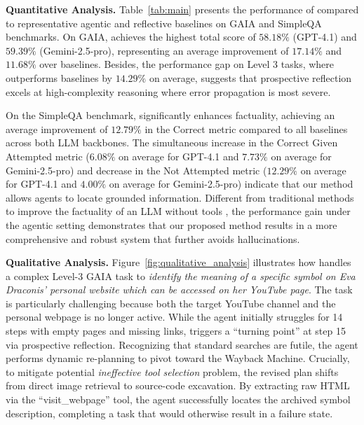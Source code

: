 \noindent\textbf{Quantitative Analysis.} Table~\ref{tab:main} presents the performance of \method compared to representative agentic and reflective baselines on GAIA and SimpleQA benchmarks. On GAIA, \method achieves the highest total score of $58.18\%$ (GPT-4.1) and $59.39\%$ (Gemini-2.5-pro), representing an average improvement of $17.14\%$ and $11.68\%$ over baselines. Besides, the performance gap on Level 3 tasks, where \method outperforms baselines by $14.29\%$ on average, suggests that prospective reflection excels at high-complexity reasoning where error propagation is most severe.

On the SimpleQA benchmark, \method significantly enhances factuality, achieving an average improvement of $12.79\%$ in the Correct metric compared to all baselines across both LLM backbones. The simultaneous increase in the Correct Given Attempted metric ($6.08\%$ on average for GPT-4.1 and $7.73\%$ on average for Gemini-2.5-pro) and decrease in the Not Attempted metric ($12.29\%$ on average for GPT-4.1 and $4.00\%$ on average for Gemini-2.5-pro) indicate that our method allows agents to locate grounded information. Different from traditional methods to improve the factuality of an LLM without tools \citep{wang2025truthflow, cao2024personalized}, the performance gain under the agentic setting demonstrates that our proposed method results in a more comprehensive and robust system that further avoids hallucinations.




\noindent\textbf{Qualitative Analysis.} Figure~\ref{fig:qualitative_analysis} illustrates how \method handles a complex Level-3 GAIA task to \textit{identify the meaning of a specific symbol on Eva Draconis' personal website which can be accessed on her YouTube page}. The task is particularly challenging because both the target YouTube channel and the personal webpage 
is no longer active. While the agent initially struggles for 14 steps with empty pages and missing links, \method triggers a ``turning point'' at step 15 via prospective reflection. Recognizing that standard searches are futile, the agent performs dynamic re-planning to pivot toward the Wayback Machine. Crucially, to mitigate potential \textit{ineffective tool selection} problem, the revised plan shifts from direct image retrieval to source-code excavation. By extracting raw HTML via the ``visit\_webpage'' tool, the agent successfully locates the archived symbol description, completing a task that would otherwise result in a failure state.


